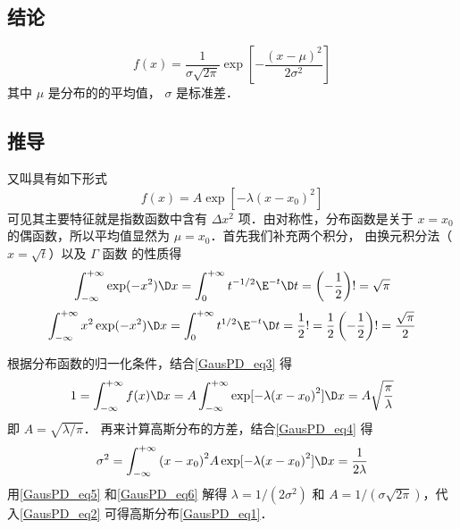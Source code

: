 
\subsection{结论}
\begin{equation}\label{GausPD_eq1}
f(x) = \frac{1}{{\sigma \sqrt {2\pi } }}\exp \left[ { - \frac{{{{(x - \mu )}^2}}}{{2{\sigma ^2}}}} \right]
\end{equation}
其中 $\mu$ 是分布的的平均值， $\sigma$ 是标准差．

\subsection{推导}
又叫具有如下形式
\begin{equation}\label{GausPD_eq2}
f\left( x \right) = A\exp [ - \lambda {(x - {x_0})^2}]
\end{equation}
可见其主要特征就是指数函数中含有 $\Delta x^2$ 项．由对称性，分布函数是关于 $x =x_0$ 的偶函数，所以平均值显然为 $\mu = x_0$．首先我们补充两个积分， 由换元积分法（$x=\sqrt{t}$）以及 $\Gamma$ 函数 的性质得
\begin{equation}\label{GausPD_eq3}
\int_{ - \infty }^{ + \infty } {\exp ( - {x^2})\D x}  = \int_0^{ + \infty } {{t^{ -1/2}}{\E^{ - t}}\D t}  = \left( -\frac 12\right)! = \sqrt \pi 
\end{equation}
\begin{equation}\label{GausPD_eq4}
\int_{ - \infty }^{ + \infty } {{x^2}\exp ( - {x^2})\D x}  = \int_0^{ + \infty } {{t^{1/2}}{\E^{ - t}}\D t}  = \frac{1}{2}! = \frac{1}{2}\left( { - \frac{1}{2}} \right)! = \frac{{\sqrt \pi  }}{2}
\end{equation}

根据分布函数的归一化条件，结合\autoref{GausPD_eq3} 得
\begin{equation}\label{GausPD_eq5}
1 = \int_{ - \infty }^{ + \infty } {f(x)\D x}  = A\int_{ - \infty }^{ + \infty } {\exp [ - \lambda {{(x - {x_0})}^2}]\D x}  = A\sqrt {\frac{\pi }{\lambda }}
\end{equation}
即 $A = \sqrt {\lambda /\pi }$． 再来计算高斯分布的方差，结合\autoref{GausPD_eq4} 得
\begin{equation}\label{GausPD_eq6}
{\sigma ^2} = \int_{ - \infty }^{ + \infty } {{{(x - {x_0})}^2}A\exp [ - \lambda {{(x - {x_0})}^2}]\D x}  = \frac{1}{{2\lambda }}
\end{equation}
用\autoref{GausPD_eq5} 和\autoref{GausPD_eq6} 解得 $\lambda = 1/(2\sigma^2)$ 和 $A = 1/(\sigma\sqrt{2\pi})$，代入\autoref{GausPD_eq2} 可得高斯分布\autoref{GausPD_eq1}．
